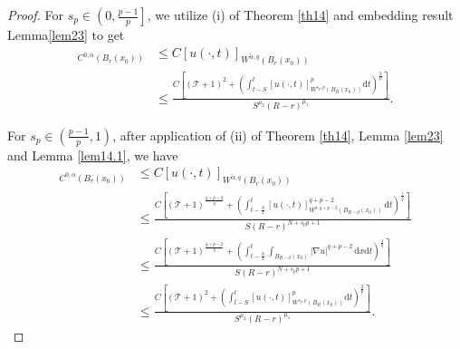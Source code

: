 \documentclass[reqno,10pt]{amsart}
\numberwithin{equation}{section}
\begin{document}
\begin{proof}
	For $s_p\in\left(0,\frac{p-1}{p}\right]$, we utilize (i) of Theorem \ref{th14} and embedding result Lemma\ref{lem23} to get
	\begin{align*}
		[u(\cdot,t)]_{C^{0,\alpha}(B_r(x_0))}&\le C[u(\cdot,t)]_{W^{\tilde{\alpha},q}(B_r(x_0))}\\
		&\le \frac{C\left[ \left( \mathcal{T}+1\right)^2+\left( \int_{t-S}^{t}[u(\cdot,t)]^p_{W^{s_p,p}\left( B_R(x_0)\right)}\mathrm{d}t\right)^{\frac{2}{p}}\right] }{S^{\mu_2}(R-r)^{\mu_1}}.
	\end{align*}
	
	For $s_p\in\left( \frac{p-1}{p},1\right)$, after application of (ii) of Theorem \ref{th14}, Lemma \ref{lem23} and Lemma \ref{lem14.1}, we have
	\begin{align*}
		[u(\cdot,t)]_{C^{0,\alpha}(B_r(x_0))}&\le C[u(\cdot,t)]_{W^{\tilde{\alpha},q}(B_r(x_0))}\\
		&\le\frac{C\left[ \left( \mathcal{T}+1\right)^{\frac{q+p-2}{q}}+\left( \int_{t-\frac{S}{2}}^{t}[u(\cdot,t)]^{q+p-2}_{W^{\sigma,q+p-2}(B_{R-d}(x_0))}\,\mathrm{d}t\right) ^\frac{1}{q}\right]}{S(R-r)^{N+s_pp+1}}\\
		&\le\frac{C\left[ \left( \mathcal{T}+1\right)^{\frac{q+p-2}{q}}+\left( \int_{t-\frac{S}{2}}^{t}\int_{B_{R-d}(x_0)}|\nabla u|^{q+p-2}\,\mathrm{d}x\mathrm{d}t\right)^\frac{1}{q}\right]}{S(R-r)^{N+s_pp+1}}\\
		&\le\frac{C\left[ \left( \mathcal{T}+1\right)^2+\left( \int_{t-S}^{t}[u(\cdot,t)]^p_{W^{s_p,p}\left( B_R(x_0)\right)}\mathrm{d}t\right)^{\frac{2}{p}}\right] }{S^{\mu_2}(R-r)^{\mu_1}}.
	\end{align*}
	

\end{proof}
\end{document}
